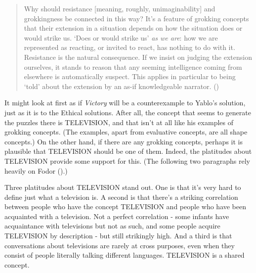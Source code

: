 \documentclass[
  11pt,
  letterpaper,
  DIV=11,
  numbers=noendperiod,
  twoside]{scrartcl}
\begin{document}
\begin{quote}
Why should resistance {[}meaning, roughly, unimaginability{]} and
grokkingness be connected in this way? It's a feature of grokking
concepts that their extension in a situation depends on how the
situation does or would strike us. `Does or would strike us' \emph{as we
are}: how we are represented as reacting, or invited to react, has
nothing to do with it. Resistance is the natural consequence. If we
insist on judging the extension ourselves, it stands to reason that any
seeming intelligence coming from elsewhere is automatically suspect.
This applies in particular to being `told' about the extension by an
as-if knowledgeable narrator. ()
\end{quote}

It might look at first as if \emph{Victory} will be a counterexample to
Yablo's solution, just as it is to the Ethical solutions. After all, the
concept that seems to generate the puzzles there is TELEVISION, and that
isn't at all like his examples of grokking concepts. (The examples,
apart from evaluative concepts, are all shape concepts.) On the other
hand, if there are any grokking concepts, perhaps it is plausible that
TELEVISION should be one of them. Indeed, the platitudes about
TELEVISION provide some support for this. (The following two paragraphs
rely heavily on Fodor ().)

Three platitudes about TELEVISION stand out. One is that it's very hard
to define just what a television is. A second is that there's a striking
correlation between people who have the concept TELEVISION and people
who have been acquainted with a television. Not a perfect correlation -
some infants have acquaintance with televisions but not as such, and
some people acquire TELEVISION by description - but still strikingly
high. And a third is that conversations about televisions are rarely at
cross purposes, even when they consist of people literally talking
different languages. TELEVISION is a shared concept.
\end{document}
